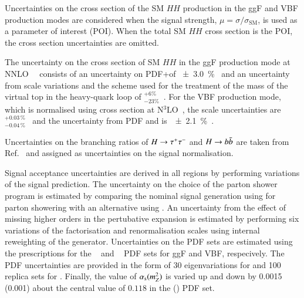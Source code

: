 Uncertainties on the cross section of the SM $HH$ production in the
ggF and VBF production modes are considered when the signal strength,
$\mu = \sigma / \sigma_{\text{SM}}$, is used as a parameter of
interest (POI). When the total SM $HH$ cross section is the POI, the
cross section uncertainties are omitted.

The uncertainty on the cross section of SM $HH$ in the ggF production
mode at NNLO~\FTapprox~\cite{Grazzini:2018bsd} consists of an
uncertainty on PDF+\alphas of \SI{\pm 3.0}{\percent}~\cite{LHCHWGHH}
and an uncertainty from scale variations and the scheme used for the
treatment of the mass of the virtual top in the heavy-quark loop of
$^{+6\%}_{-23\%}$~\cite{Baglio:2020wgt}. For the VBF production mode,
which is normalised using cross section at
N$^3$LO~\cite{Dreyer:2018qbw}, the scale uncertainties
are~$^{+0.03\,\%}_{-0.04\,\%}$~\cite{LHCHWGHH} and the uncertainty from
PDF and \alphas is~\SI{\pm 2.1}{\percent}~\cite{LHCHWGHH}.

Uncertainties on the branching ratios of $H \to \tau^{+} \tau^{-}$ and
$H \to b\bar{b}$ are taken from Ref.~\cite{deFlorian:2016spz} and
assigned as uncertainties on the signal normalisation.

Signal acceptance uncertainties are derived in all regions by
performing variations of the signal prediction.
The uncertainty on the choice of the parton shower program is
estimated by comparing the nominal signal generation using
\PYTHIA[8.244] for parton showering with an alternative using
\HERWIG[7.1.6]. An uncertainty from the effect of missing higher
orders in the pertubative expansion is estimated by performing six
variations of the factorisation and renormalisation scales using
internal reweighting of the generator. Uncertainties on the PDF sets
are estimated using the prescriptions for the
\PDFforLHC[15nlo]~\cite{Butterworth:2015oua} and
\NNPDF[3.0nlo]~\cite{Ball:2014uwa} PDF sets for ggF and VBF,
respecively. The PDF uncertainties are provided in the form of 30
eigenvariations for \PDFforLHC[15nlo] and 100 replica sets for
\NNPDF[3.0nlo]. Finally, the value of $\alpha_{\text{s}}(m_{Z}^2)$ is varied up
and down by 0.0015 (0.001) about the central value of $0.118$ in the
\PDFforLHC[15nlo] (\NNPDF[3.0nlo]) PDF set.


